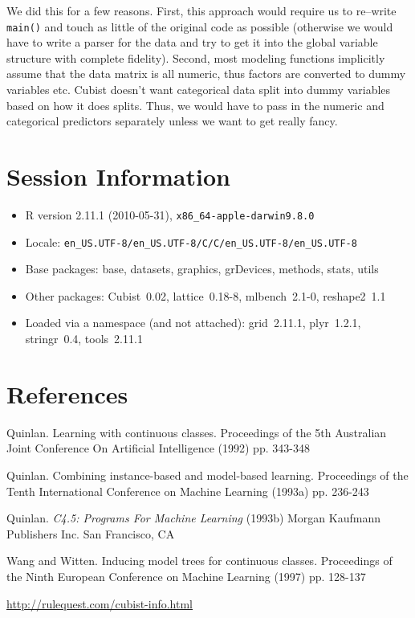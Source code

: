 \documentclass[12pt]{article}
\newcommand{\code}[1]{\mbox{\footnotesize\color{darkblue}\texttt{#1}}}
\begin{document}
We did this for a few reasons. First, this approach would require us to re--write \code{main()} and touch as little of the
original code as possible (otherwise we would have to write a parser for the
data and try to get it into the global variable structure with complete fidelity). Second, 
most modeling functions implicitly assume that the data matrix is all numeric,
thus factors are converted to dummy variables etc. Cubist doesn't want categorical
data split into dummy variables based on how it does splits. Thus, we would have
to pass in the numeric and categorical predictors separately unless we want to
get really fancy.


\section{Session Information}

\begin{itemize}\raggedright
  \item R version 2.11.1 (2010-05-31), \verb|x86_64-apple-darwin9.8.0|
  \item Locale: \verb|en_US.UTF-8/en_US.UTF-8/C/C/en_US.UTF-8/en_US.UTF-8|
  \item Base packages: base, datasets, graphics, grDevices, methods, stats, utils
  \item Other packages: Cubist~0.02, lattice~0.18-8, mlbench~2.1-0, reshape2~1.1
  \item Loaded via a namespace (and not attached): grid~2.11.1, plyr~1.2.1, stringr~0.4, tools~2.11.1
\end{itemize}
\section{References}

\begin{description}
   \item Quinlan. Learning with continuous classes. Proceedings of the 5th Australian Joint Conference On Artificial Intelligence (1992) pp. 343-348

   \item Quinlan. Combining instance-based and model-based learning. Proceedings of the Tenth International Conference on Machine Learning (1993a) pp. 236-243

   \item Quinlan. {\it C4.5: Programs For Machine Learning} (1993b) Morgan Kaufmann Publishers Inc. San Francisco, CA

   \item Wang and Witten. Inducing model trees for continuous classes. Proceedings of the Ninth European Conference on Machine Learning (1997) pp. 128-137

   \item \href{http://rulequest.com/cubist-info.html}{http://rulequest.com/cubist-info.html}
\end{description}
\end{document}
